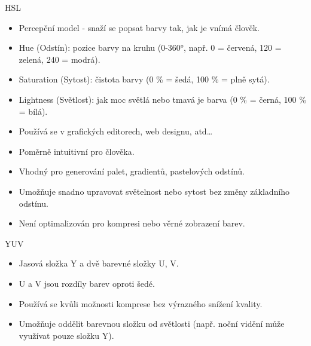 \documentclass[aspectratio=169,xcolor=dvipsnames, t]{beamer}
\begin{document}
{\begin{frame}{HSL}
    \begin{itemize}
        \item Percepční model - snaží se popsat barvy tak, jak je vnímá člověk.
        \item Hue (Odstín): pozice barvy na kruhu (0-360°, např. 0 = červená, 120 = zelená, 240 = modrá).
        \item Saturation (Sytost): čistota barvy (0 \% = šedá, 100 \% = plně sytá).
        \item Lightness (Světlost): jak moc světlá nebo tmavá je barva (0 \% = černá, 100 \% = bílá).
        \item Používá se v grafických editorech, web designu, atd\ldots
        \item Poměrně intuitivní pro člověka.
        \item Vhodný pro generování palet, gradientů, pastelových odstínů.
        \item Umožňuje snadno upravovat světelnost nebo sytost bez změny základního odstínu.
        \item Není optimalizován pro kompresi nebo věrné zobrazení barev.
    \end{itemize}
\end{frame}

\begin{frame}{YUV}
    \begin{itemize}
        \item Jasová složka Y a dvě barevné složky U, V.
        \item U a V jsou rozdíly barev oproti šedé.
        \item Používá se kvůli možnosti komprese bez výrazného snížení kvality.
        \item Umožňuje oddělit barevnou složku od světlosti (např. noční vidění může využívat pouze složku Y).
    \end{itemize}
\end{frame}

}
\end{document}
